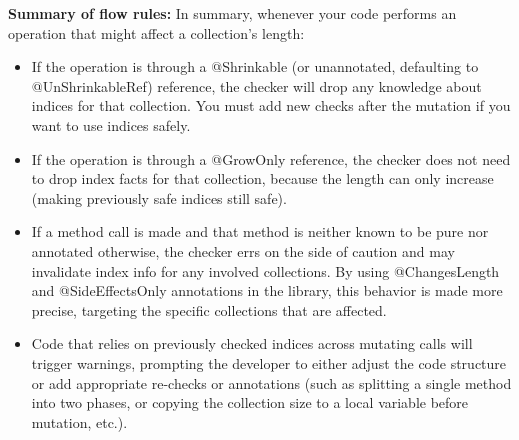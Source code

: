 \textbf{Summary of flow rules:} In summary, whenever your code performs an operation that might affect a collection’s length:
\begin{itemize}
\item
  If the operation is through a @Shrinkable (or unannotated, defaulting to @UnShrinkableRef) reference,
  the checker will drop any knowledge about indices for that collection. You must add new checks
  after the mutation if you want to use indices safely.
\item
  If the operation is through a @GrowOnly reference, the checker does not need to drop index facts for that collection,
  because the length can only increase (making previously safe indices still safe).
\item
  If a method call is made and that method is neither known to be pure nor annotated otherwise, the checker errs on the
  side of caution and may invalidate index info for any involved collections. By using @ChangesLength and @SideEffectsOnly
  annotations in the library, this behavior is made more precise, targeting the specific collections that are affected.
\item
  Code that relies on previously checked indices across mutating calls will trigger warnings, prompting the developer
  to either adjust the code structure or add appropriate re-checks or annotations (such as splitting a single method
  into two phases, or copying the collection size to a local variable before mutation, etc.).
\end{itemize}


